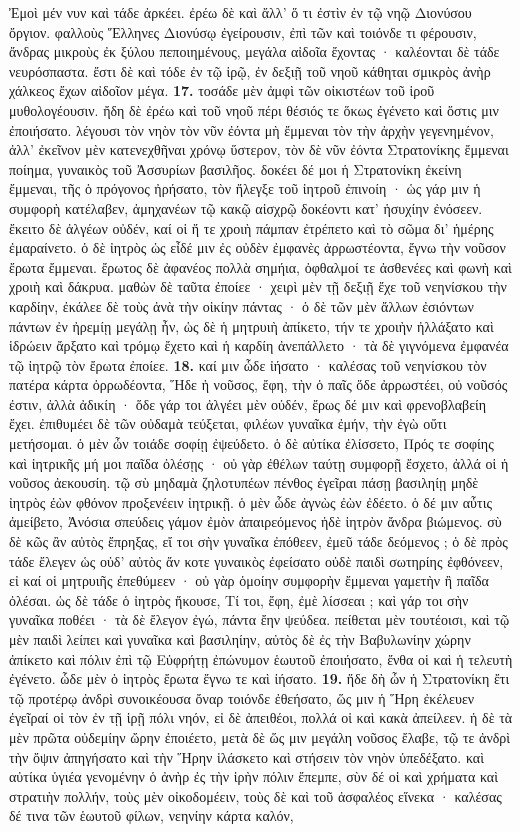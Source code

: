 \documentclass[a4paper, 11pt, oneside, polutonikogreek, german]{article}
\begin{document}
Ἐμοὶ μέν νυν καὶ τάδε ἀρκέει. ἐρέω δὲ καὶ ἄλλ' ὅ τι ἐστὶν ἐν τῷ νηῷ Διονύσου ὄργιον. φαλλοὺς Ἕλληνες Διονύσῳ ἐγείρουσιν, ἐπὶ τῶν καὶ τοιόνδε τι φέρουσιν, ἄνδρας μικροὺς ἐκ ξύλου πεποιημένους, μεγάλα αἰδοῖα ἔχοντας · καλέονται δὲ τάδε νευρόσπαστα. ἔστι δὲ καὶ τόδε ἐν τῷ ἱρῷ, ἐν δεξιῇ τοῦ νηοῦ κάθηται σμικρὸς ἀνὴρ χάλκεος ἔχων αἰδοῖον μέγα. \textbf{17.} τοσάδε μὲν ἀμφὶ τῶν οἰκιστέων τοῦ ἱροῦ μυθολογέουσιν. ἤδη δὲ ἐρέω καὶ τοῦ νηοῦ πέρι θέσιός τε ὅκως ἐγένετο καὶ ὅστις μιν ἐποιήσατο. λέγουσι τὸν νηὸν τὸν νῦν ἐόντα μὴ ἔμμεναι τὸν τὴν ἀρχὴν γεγενημένον, ἀλλ' ἐκεῖνον μὲν κατενεχθῆναι χρόνῳ ὕστερον, τὸν δὲ νῦν ἐόντα Στρατονίκης ἔμμεναι ποίημα, γυναικὸς τοῦ Ἀσσυρίων βασιλῆος. δοκέει δέ μοι ἡ Στρατονίκη ἐκείνη ἔμμεναι, τῆς ὁ πρόγονος ἠρήσατο, τὸν ἤλεγξε τοῦ ἰητροῦ ἐπινοίη · ὡς γάρ μιν ἡ συμφορὴ κατέλαβεν, ἀμηχανέων τῷ κακῷ αἰσχρῷ δοκέοντι κατ' ἡσυχίην ἐνόσεεν. ἔκειτο δὲ ἀλγέων οὐδέν, καί οἱ ἥ τε χροιὴ πάμπαν ἐτρέπετο καὶ τὸ σῶμα δι' ἡμέρης ἐμαραίνετο. ὁ δὲ ἰητρὸς ὡς εἶδέ μιν ἐς οὐδὲν ἐμφανὲς ἀρρωστέοντα, ἔγνω τὴν νοῦσον ἔρωτα ἔμμεναι. ἔρωτος δὲ ἀφανέος πολλὰ σημήια, ὀφθαλμοί τε ἀσθενέες καὶ φωνὴ καὶ χροιὴ καὶ δάκρυα. μαθὼν δὲ ταῦτα ἐποίεε · χειρὶ μὲν τῇ δεξιῇ ἔχε τοῦ νεηνίσκου τὴν καρδίην, ἐκάλεε δὲ τοὺς ἀνὰ τὴν οἰκίην πάντας · ὁ δὲ τῶν μὲν ἄλλων ἐσιόντων πάντων ἐν ἠρεμίῃ μεγάλῃ ἦν, ὡς δὲ ἡ μητρυιὴ ἀπίκετο, τήν τε χροιὴν ἠλλάξατο καὶ ἱδρώειν ἄρξατο καὶ τρόμῳ ἔχετο καὶ ἡ καρδίη ἀνεπάλλετο · τὰ δὲ γιγνόμενα ἐμφανέα τῷ ἰητρῷ τὸν ἔρωτα ἐποίεε. \textbf{18.} καί μιν ὧδε ἰήσατο · καλέσας τοῦ νεηνίσκου τὸν πατέρα κάρτα ὀρρωδέοντα, Ἥδε ἡ νοῦσος, ἔφη, τὴν ὁ παῖς ὅδε ἀρρωστέει, οὐ νοῦσός ἐστιν, ἀλλὰ ἀδικίη · ὅδε γάρ τοι ἀλγέει μὲν οὐδέν, ἔρως δέ μιν καὶ φρενοβλαβείη ἔχει. ἐπιθυμέει δὲ τῶν οὐδαμὰ τεύξεται, φιλέων γυναῖκα ἐμήν, τὴν ἐγὼ οὔτι μετήσομαι. ὁ μὲν ὦν τοιάδε σοφίῃ ἐψεύδετο. ὁ δὲ αὐτίκα ἐλίσσετο, Πρός τε σοφίης καὶ ἰητρικῆς μή μοι παῖδα ὀλέσῃς · οὐ γὰρ ἐθέλων ταύτῃ συμφορῇ ἔσχετο, ἀλλά οἱ ἡ νοῦσος ἀεκουσίη. τῷ σὺ μηδαμὰ ζηλοτυπέων πένθος ἐγεῖραι πάσῃ βασιληίῃ μηδὲ ἰητρὸς ἐὼν φθόνον προξενέειν ἰητρικῇ. ὁ μὲν ὧδε ἀγνὼς ἐὼν ἐδέετο. ὁ δέ μιν αὖτις ἀμείβετο, Ἀνόσια σπεύδεις γάμον ἐμὸν ἀπαιρεόμενος ἡδὲ ἰητρὸν ἄνδρα βιώμενος. σὺ δὲ κῶς ἂν αὐτὸς ἔπρηξας, εἴ τοι σὴν γυναῖκα ἐπόθεεν, ἐμεῦ τάδε δεόμενος ; ὁ δὲ πρὸς τάδε ἔλεγεν ὡς οὐδ' αὐτὸς ἄν κοτε γυναικὸς ἐφείσατο οὐδὲ παιδὶ σωτηρίης ἐφθόνεεν, εἰ καί οἱ μητρυιῆς ἐπεθύμεεν · οὐ γὰρ ὁμοίην συμφορὴν ἔμμεναι γαμετὴν ἢ παῖδα ὀλέσαι. ὡς δὲ τάδε ὁ ἰητρὸς ἤκουσε, Τί τοι, ἔφη, ἐμὲ λίσσεαι ; καὶ γάρ τοι σὴν γυναῖκα ποθέει · τὰ δὲ ἔλεγον ἐγώ, πάντα ἔην ψεύδεα. πείθεται μὲν τουτέοισι, καὶ τῷ μὲν παιδὶ λείπει καὶ γυναῖκα καὶ βασιληίην, αὐτὸς δὲ ἐς τὴν Βαβυλωνίην χώρην ἀπίκετο καὶ πόλιν ἐπὶ τῷ Εὐφρήτῃ ἐπώνυμον ἑωυτοῦ ἐποιήσατο, ἔνθα οἱ καὶ ἡ τελευτὴ ἐγένετο. ὧδε μὲν ὁ ἰητρὸς ἔρωτα ἔγνω τε καὶ ἰήσατο. \textbf{19.} ἥδε δὴ ὦν ἡ Στρατονίκη ἔτι τῷ προτέρῳ ἀνδρὶ συνοικέουσα ὄναρ τοιόνδε ἐθεήσατο, ὥς μιν ἡ Ἥρη ἐκέλευεν ἐγεῖραί οἱ τὸν ἐν τῇ ἱρῇ πόλι νηόν, εἰ δὲ ἀπειθέοι, πολλά οἱ καὶ κακὰ ἀπείλεεν. ἡ δὲ τὰ μὲν πρῶτα οὐδεμίην ὤρην ἐποιέετο, μετὰ δὲ ὥς μιν μεγάλη νοῦσος ἔλαβε, τῷ τε ἀνδρὶ τὴν ὄψιν ἀπηγήσατο καὶ τὴν Ἥρην ἱλάσκετο καὶ στήσειν τὸν νηὸν ὑπεδέξατο. καὶ αὐτίκα ὑγιέα γενομένην ὁ ἀνὴρ ἐς τὴν ἱρὴν πόλιν ἔπεμπε, σὺν δέ οἱ καὶ χρήματα καὶ στρατιὴν πολλήν, τοὺς μὲν οἰκοδομέειν, τοὺς δὲ καὶ τοῦ ἀσφαλέος εἵνεκα · καλέσας δέ τινα τῶν ἑωυτοῦ φίλων, νεηνίην κάρτα καλόν, 
\end{document}
